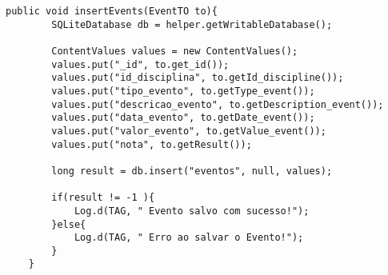\begin{lstlisting}[style=custom_JAVA]
public void insertEvents(EventTO to){
        SQLiteDatabase db = helper.getWritableDatabase();

        ContentValues values = new ContentValues();
        values.put("_id", to.get_id());
        values.put("id_disciplina", to.getId_discipline());
        values.put("tipo_evento", to.getType_event());
        values.put("descricao_evento", to.getDescription_event());
        values.put("data_evento", to.getDate_event());
        values.put("valor_evento", to.getValue_event());
        values.put("nota", to.getResult());

        long result = db.insert("eventos", null, values);

        if(result != -1 ){
            Log.d(TAG, " Evento salvo com sucesso!");
        }else{
            Log.d(TAG, " Erro ao salvar o Evento!");
        }
    }
\end{lstlisting}
